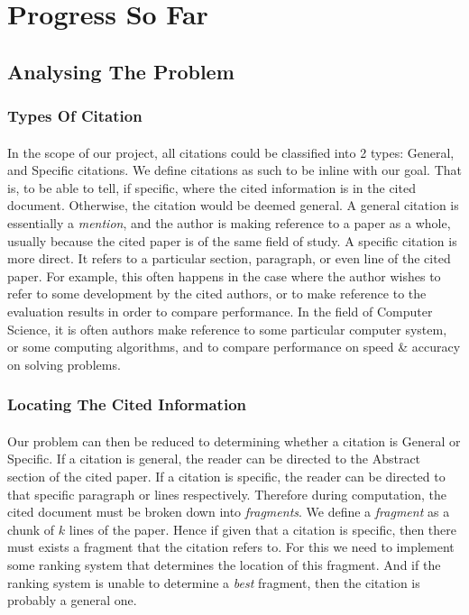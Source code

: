 \documentclass[12 pt]{article}
\begin{document}
\section{Progress So Far}
\subsection{Analysing The Problem}
\subsubsection{Types Of Citation}
\paragraph{}
In the scope of our project, all citations could be classified into 2 types: General, and Specific citations. We define citations as such to be inline with our goal. That is, to be able to tell, if specific, where the cited information is in the cited document. Otherwise, the citation would be deemed general. A general citation is essentially a \textit{mention}, and the author is making reference to a paper as a whole, usually because the cited paper is of the same field of study. A specific citation is more direct. It refers to a particular section, paragraph, or even line of the cited paper. For example, this often happens in the case where the author wishes to refer to some development by the cited authors, or to make reference to the evaluation results in order to compare performance. In the field of Computer Science, it is often authors make reference to some particular computer system, or some computing algorithms, and to compare performance on speed \& accuracy on solving problems.

\subsubsection{Locating The Cited Information}
\paragraph{}
Our problem can then be reduced to determining whether a citation is General or Specific. If a citation is general, the reader can be directed to the Abstract section of the cited paper. If a citation is specific, the reader can be directed to that specific paragraph or lines respectively. Therefore during computation, the cited document must be broken down into \textit{fragments}. We define a \textit{fragment} as a chunk of $k$ lines of the paper. Hence if given that a citation is specific, then there must exists a fragment that the citation refers to. For this we need to implement some ranking system that determines the location of this fragment. And if the ranking system is unable to determine a \textit{best} fragment, then the citation is probably a general one.
\end{document}
